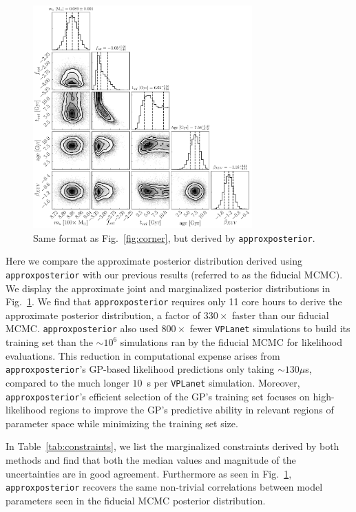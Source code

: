 \documentclass[twocolumn]{aastex62}
\newcommand{\vplanet}[0]{\texttt{VPLanet}\xspace}
\newcommand{\approxposterior}[0]{\texttt{approxposterior}\xspace}
\begin{document}
\begin{figure}[t]
\centering
	\includegraphics[width=0.75\textwidth]{../Analysis/Approx/apCorner.pdf}
   \caption{Same format as Fig.~\ref{fig:corner}, but derived by \approxposterior.}%
    \label{fig:approx}%
\end{figure}

Here we compare the approximate posterior distribution derived using \approxposterior with our previous results (referred to as the fiducial MCMC). We display the approximate joint and marginalized posterior distributions in Fig.~\ref{fig:approx}. We find that \approxposterior requires only 11 core hours to derive the approximate posterior distribution, a factor of $330\times$ faster than our fiducial MCMC. \approxposterior also used $800\times$ fewer \vplanet simulations to build its training set than the ${\sim}10^6$ simulations ran by the fiducial MCMC for likelihood evaluations. This reduction in computational expense arises from \approxposterior's GP-based likelihood predictions only taking ${\sim}130\mu$s, compared to the much longer $10$~s per \vplanet simulation. Moreover, \approxposterior's efficient selection of the GP's training set focuses on high-likelihood regions to improve the GP's predictive ability in relevant regions of parameter space while minimizing the training set size. 

In Table~\ref{tab:constraints}, we list the marginalized constraints derived by both methods and find that both the median values and magnitude of the uncertainties are in good agreement. Furthermore as seen in Fig.~\ref{fig:approx}, \approxposterior recovers the same non-trivial correlations between model parameters seen in the fiducial MCMC posterior distribution. 
\end{document}
